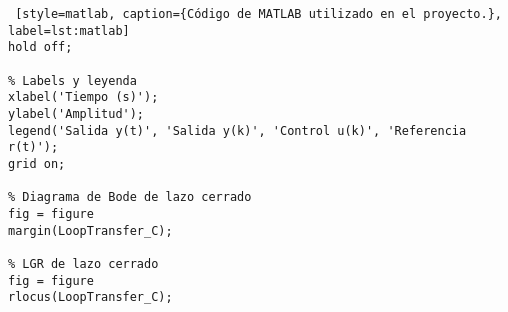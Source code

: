 \begin{adjustwidth}{0.5cm}{0.5cm}
\begin{lstlisting} [style=matlab, caption={Código de MATLAB utilizado en el proyecto.}, label=lst:matlab]
hold off; 

% Labels y leyenda
xlabel('Tiempo (s)'); 
ylabel('Amplitud'); 
legend('Salida y(t)', 'Salida y(k)', 'Control u(k)', 'Referencia r(t)'); 
grid on; 

% Diagrama de Bode de lazo cerrado
fig = figure
margin(LoopTransfer_C);

% LGR de lazo cerrado
fig = figure 
rlocus(LoopTransfer_C); 
\end{lstlisting}
\end{adjustwidth}
